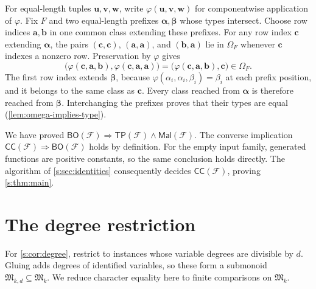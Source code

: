 \documentclass[11pt,letterpaper,onecolumn]{article}
\theoremstyle{plain}
\theoremstyle{definition}
\theoremstyle{remark}
\newcommand{\cF}{\mathcal F}
\newcommand{\CC}{\mathsf{CC}}
\newcommand{\BO}{\mathsf{BO}}
\newcommand{\TP}{\mathsf{TP}}
\newcommand{\Mal}{\mathsf{Mal}}
\newcommand{\RowEq}[1]{\Omega_{#1}}
\begin{document}
For equal-length tuples $\mathbf u,\mathbf v,\mathbf w$, write
$\varphi(\mathbf u,\mathbf v,\mathbf w)$ for componentwise application
of $\varphi$.
Fix $F$ and two equal-length prefixes $\boldsymbol\alpha,
\boldsymbol\beta$ whose types intersect. Choose row indices
$\mathbf a,\mathbf b$ in one common class extending these prefixes.
For any row index $\mathbf c$ extending $\boldsymbol\alpha$,
the pairs $(\mathbf c,\mathbf c)$, $(\mathbf a,\mathbf a)$, and
$(\mathbf b,\mathbf a)$ lie in $\RowEq F$ whenever $\mathbf c$
indexes a nonzero row. Preservation by $\varphi$ gives
\[
 \bigl(\varphi(\mathbf c,\mathbf a,\mathbf b),
       \varphi(\mathbf c,\mathbf a,\mathbf a)\bigr)
 =\bigl(\varphi(\mathbf c,\mathbf a,\mathbf b),\mathbf c\bigr)
 \in\RowEq F.
\]
The first row index extends $\boldsymbol\beta$, because
$\varphi(\alpha_i,\alpha_i,\beta_i)=\beta_i$ at each prefix
position, and it belongs to the same class as $\mathbf c$.
Every class reached from $\boldsymbol\alpha$ is therefore reached
from $\boldsymbol\beta$. Interchanging the prefixes proves that
their types are equal (\cref{lem:omega-implies-type}).

We have proved $\BO(\cF)\Rightarrow\TP(\cF)\wedge\Mal(\cF)$.
The converse implication $\CC(\cF)\Rightarrow\BO(\cF)$ holds by
definition. For the empty input family, generated functions are positive
constants, so the same conclusion holds directly.
The algorithm of \cref{s:sec:identities} consequently decides
$\CC(\cF)$, proving \cref{s:thm:main}.

\section{The degree restriction}
\label{s:sec:degree}

For \cref{s:cor:degree}, restrict to instances whose variable degrees are
divisible by $d$. Gluing adds degrees of identified variables, so these
form a submonoid $\mathfrak M_{k,d}\subseteq\mathfrak M_k$.
We reduce character equality here to finite comparisons on $\mathfrak M_k$.
\end{document}
